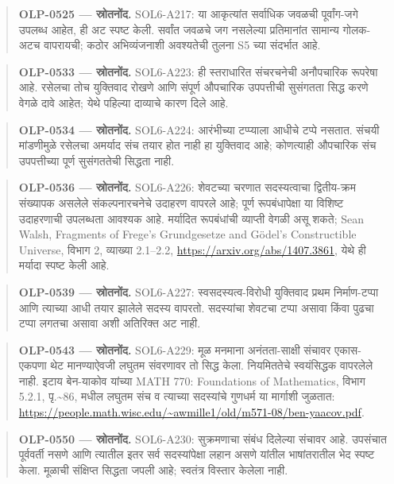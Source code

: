 \begin{quote}\small\textbf{OLP-0525 — स्रोतनोंद.} SOL6-A217: या आकृत्यांत सर्वाधिक जवळची पूर्वांग-जगे उपलब्ध आहेत, ही अट स्पष्ट केली. सर्वांत जवळचे जग नसलेल्या प्रतिमानांत सामान्य गोलक-अटच वापरायची; कठोर अभिव्यंजनाशी अवश्यतेची तुलना S5 च्या संदर्भात आहे.\end{quote}
\begin{quote}\small\textbf{OLP-0533 — स्रोतनोंद.} SOL6-A223: ही स्तराधारित संचरचनेची अनौपचारिक रूपरेषा आहे. रसेलचा तोच युक्तिवाद रोखणे आणि संपूर्ण औपचारिक उपपत्तीची सुसंगतता सिद्ध करणे वेगळे दावे आहेत; येथे पहिल्या दाव्याचे कारण दिले आहे.\end{quote}
\begin{quote}\small\textbf{OLP-0534 — स्रोतनोंद.} SOL6-A224: आरंभीच्या टप्प्याला आधीचे टप्पे नसतात. संचयी मांडणीमुळे रसेलचा अमर्याद संच तयार होत नाही हा युक्तिवाद आहे; कोणत्याही औपचारिक संच उपपत्तीच्या पूर्ण सुसंगततेची सिद्धता नाही.\end{quote}
\begin{quote}\small\textbf{OLP-0536 — स्रोतनोंद.} SOL6-A226: शेवटच्या चरणात सदस्यत्वाचा द्वितीय-क्रम संख्यापक असलेले संकल्पनारचनेचे उदाहरण वापरले आहे; पूर्ण रूपबंधापेक्षा या विशिष्ट उदाहरणाची उपलब्धता आवश्यक आहे. मर्यादित रूपबंधांची व्याप्ती वेगळी असू शकते; Sean Walsh, Fragments of Frege’s Grundgesetze and Gödel’s Constructible Universe, विभाग 2, व्याख्या 2.1--2.2, \url{https://arxiv.org/abs/1407.3861}, येथे ही मर्यादा स्पष्ट केली आहे.\end{quote}
\begin{quote}\small\textbf{OLP-0539 — स्रोतनोंद.} SOL6-A227: स्वसदस्यत्व-विरोधी युक्तिवाद प्रथम निर्माण-टप्पा आणि त्याच्या आधी तयार झालेले सदस्य वापरतो. सदस्यांचा शेवटचा टप्पा असावा किंवा पुढचा टप्पा लगतचा असावा अशी अतिरिक्त अट नाही.\end{quote}
\begin{quote}\small\textbf{OLP-0543 — स्रोतनोंद.} SOL6-A229: मूळ मनमाना अनंतता-साक्षी संचावर एकास-एकपणा थेट मानण्याऐवजी लघुतम संवरणावर तो सिद्ध केला. नियमिततेचे स्वयंसिद्धक वापरलेले नाही. इटाय बेन-याकोव यांच्या MATH 770: Foundations of Mathematics, विभाग 5.2.1, पृ.\textasciitilde{}86, मधील लघुतम संच व त्याच्या सदस्यांचे गुणधर्म या मार्गाशी जुळतात: \url{https://people.math.wisc.edu/~awmille1/old/m571-08/ben-yaacov.pdf}.\end{quote}
\begin{quote}\small\textbf{OLP-0550 — स्रोतनोंद.} SOL6-A230: सुक्रमणाचा संबंध दिलेल्या संचावर आहे. उपसंचात पूर्ववर्ती नसणे आणि त्यातील इतर सर्व सदस्यांपेक्षा लहान असणे यांतील भाषांतरातील भेद स्पष्ट केला. मूळाची संक्षिप्त सिद्धता जपली आहे; स्वतंत्र विस्तार केलेला नाही.\end{quote}
